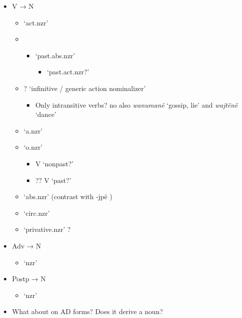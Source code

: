 \documentclass{memoir}
\begin{document}
\begin{itemize}
\tightlist
\item
  V → N

  \begin{itemize}
  \item
     `act.nzr'
  \item

    \begin{itemize}
    \tightlist
    \item
      `past.abs.nzr'

      \begin{itemize}
      \tightlist
      \item
        `past.act.nzr?'
      \end{itemize}
    \end{itemize}
  \item
    ? `infinitive / generic action nominalizer'

    \begin{itemize}
    \tightlist
    \item
      Only intransitive verbs? no also \emph{wanumanë} `gossip, lie' and
      \emph{wajtënë} `dance'
    \end{itemize}
  \item
     `a.nzr'
  \item
     `o.nzr'

    \begin{itemize}
    \tightlist
    \item
      V `nonpast?'
    \item
      ?? V `past?'
    \end{itemize}
  \item
     `abs.nzr' (contrast with ‑jpë )
  \item
     `circ.nzr'
  \item
     `privative.nzr' ?
  \end{itemize}
\item
  Adv → N

  \begin{itemize}
  \tightlist
  \item
     `nzr'
  \end{itemize}
\item
  Postp → N

  \begin{itemize}
  \tightlist
  \item
     `nzr'
  \end{itemize}
\item
  What about  on AD forms? Does it derive a noun?
\end{itemize}
\end{document}
